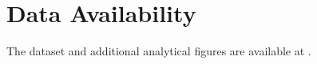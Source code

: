 \section{Data Availability}
\label{sec:data_availability}

The dataset and additional analytical figures are available at \cite{bfp_artifacts}.
